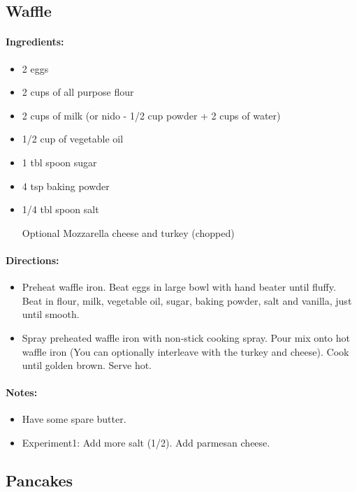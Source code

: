 \documentclass{article}
\begin{document}
\subsection{Waffle}

\paragraph{Ingredients:}

\begin{itemize}
	\item 2 eggs
	\item 2 cups of all purpose flour
	\item 2 cups of milk (or nido - 1/2 cup powder + 2 cups of water)
	\item 1/2 cup of vegetable oil
	\item 1 tbl spoon sugar
	\item 4 tsp baking powder
	\item 1/4 tbl spoon salt
	\item [Optional] Mozzarella cheese and turkey (chopped)
\end{itemize}

\paragraph{Directions:}
\begin{itemize}
	\item Preheat waffle iron. Beat eggs in large bowl with hand beater until fluffy. Beat in flour, milk, vegetable oil, sugar, baking powder, salt and vanilla, just until smooth.
	\item Spray preheated waffle iron with non-stick cooking spray. Pour mix onto hot waffle iron (You can optionally interleave with the turkey and cheese). Cook until golden brown. Serve hot.
\end{itemize}

\paragraph{Notes:}
\begin{itemize}
	\item Have some spare butter.
	\item Experiment1: Add more salt (1/2). Add parmesan cheese.
\end{itemize}

\subsection{Pancakes}
\end{document}
